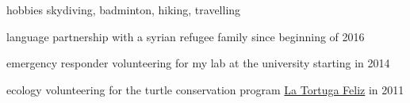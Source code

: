 


       
\begin{cvextracurr}
	\cvextra
    {hobbies} %
	{skydiving, badminton, hiking, travelling}
	
	\cvextra
    {language partnership} %
	{with a syrian refugee family since beginning of 2016}

	\cvextra
    {emergency responder} %
	{volunteering for my lab at the university starting in 2014}	
	
	\cvextra
    {ecology volunteering} %
	{for the turtle conservation program \href{http://www.latortugafeliz.com/}{La Tortuga Feliz} in 2011}
    
\end{cvextracurr}
